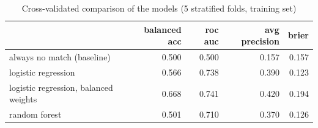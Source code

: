 \begin{table}[htbp]
\centering
\caption{Cross-validated comparison of the models (5 stratified folds, training set)}
\label{tab:q8_model_comparison}
\begin{tabular}{lrrrr}
\toprule
 & balanced acc & roc auc & avg precision & brier \\
\midrule
always no match (baseline) & 0.500 & 0.500 & 0.157 & 0.157 \\
logistic regression & 0.566 & 0.738 & 0.390 & 0.123 \\
logistic regression, balanced weights & 0.668 & 0.741 & 0.420 & 0.194 \\
random forest & 0.501 & 0.710 & 0.370 & 0.126 \\
\bottomrule
\end{tabular}
\end{table}
